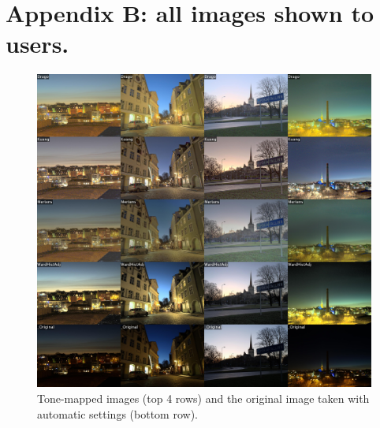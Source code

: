 \documentclass[a4paper]{scrartcl}
\begin{document}
\newpage\section*{Appendix B: all images shown to users.}
\begin{figure}[h!]
\centering
\includegraphics[width=1\textwidth]{../images/combined.jpg}
\caption{Tone-mapped images (top 4 rows) and the original image taken with automatic settings (bottom row).}
\label{fig:tiled_tmo_images}
\end{figure}
\end{document}
